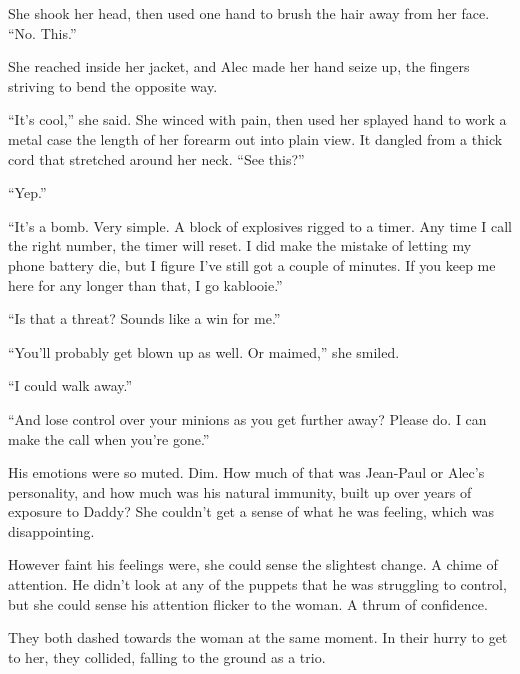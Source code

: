 She shook her head, then used one hand to brush the hair away from her face.  ``No.  This.''



She reached inside her jacket, and Alec made her hand seize up, the fingers striving to bend the opposite way.



``It's cool,'' she said.  She winced with pain, then used her splayed hand to work a metal case the length of her forearm out into plain view.  It dangled from a thick cord that stretched around her neck.  ``See this?''



``Yep.''



``It's a bomb.  Very simple.  A block of explosives rigged to a timer.  Any time I call the right number, the timer will reset.  I did make the mistake of letting my phone battery die, but I figure I've still got a couple of minutes.  If you keep me here for any longer than that, I go kablooie.''



``Is that a threat?  Sounds like a win for me.''



``You'll probably get blown up as well.  Or maimed,'' she smiled.



``I could walk away.''



``And lose control over your minions as you get further away?  Please do.  I can make the call when you're gone.''



His emotions were so muted.  Dim.  How much of that was Jean-Paul or Alec's personality, and how much was his natural immunity, built up over years of exposure to Daddy?  She couldn't get a sense of what he was feeling, which was disappointing.



However faint his feelings were, she could sense the slightest change.  A chime of attention.  He didn't look at any of the puppets that he was struggling to control, but she could sense his attention flicker to the woman.  A thrum of confidence.



They both dashed towards the woman at the same moment.  In their hurry to get to her, they collided, falling to the ground as a trio.




